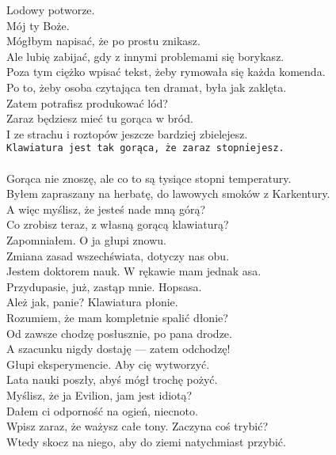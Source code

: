 \chardok{}
Lodowy potworze.\\
Mój ty Boże.\\
Mógłbym napisać, że po prostu znikasz. \\
Ale lubię zabijać, gdy z innymi problemami się borykasz.\\
Poza tym ciężko wpisać tekst, żeby rymowała się każda komenda.\\
Po to, żeby osoba czytająca ten dramat, była jak zaklęta.\\
Zatem potrafisz produkować lód?\\
Zaraz będziesz mieć tu gorąca w bród.\\
I ze strachu i roztopów jeszcze bardziej zbielejesz.\\
\texttt{Klawiatura jest tak gorąca, że zaraz stopniejesz.}\\

\\

\charmik{}
Gorąca nie znoszę, ale co to są tysiące stopni temperatury.\\
Byłem zapraszany na herbatę, do lawowych smoków z Karkentury.\\
A więc myślisz, że jesteś nade mną górą?\\
Co zrobisz teraz, z własną gorącą klawiaturą?\\

\chardok{}
Zapomniałem. O ja głupi znowu.\\
Zmiana zasad wszechświata, dotyczy nas obu.\\
Jestem doktorem nauk. W rękawie mam jednak asa.\\
Przydupasie, już, zastąp mnie. Hopsasa.\\

\charprzy{}
Ależ jak, panie? Klawiatura płonie.\\
Rozumiem, że mam kompletnie spalić dłonie?\\
Od zawsze chodzę posłusznie, po pana drodze.\\
A szacunku nigdy dostaję --- zatem odchodzę!\\

\chardok{}
Głupi eksperymencie. Aby cię wytworzyć.\\
Lata nauki poszły, abyś mógł trochę pożyć.\\
Myślisz, że ja Evilion, jam jest idiotą?\\
Dałem ci odporność na ogień, niecnoto.\\
Wpisz zaraz, że ważysz całe tony. Zaczyna coś trybić?\\
Wtedy skocz na niego, aby do ziemi natychmiast przybić.\\

